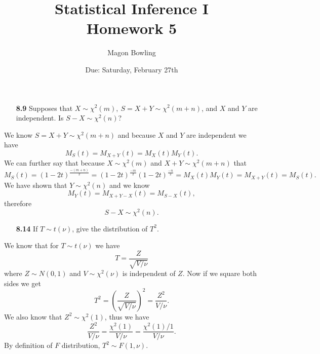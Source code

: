 \documentclass[11pt]{article}
\theoremstyle{definition}
\newcommand{\1}[1]{\mathbf{1} \left \{ #1 \right \}}
\begin{document}
\title{Statistical Inference I \\ Homework 5}
\date{Due: Saturday, February 27th}
\author{Magon Bowling}

\maketitle

\begin{itemize}
\item [{\color{red} \textbf{8.9}}] Supposes that $X \sim \chi^2(m), \ S = X+Y \sim \chi^2(m+n)$, and $X$ and $Y$ are independent. Is $S - X \sim \chi^2(n)$?
\end{itemize}
We know \(S = X+Y \sim \chi^2(m+n)\) and because $X$ and $Y$ are independent we have
\[M_S (t) = M_{X+Y} (t) = M_X (t) M_Y (t).\]
We can further say that because $X \sim \chi^2(m)$ and $X+Y \sim \chi^2(m+n)$ that
\[M_S (t) = (1-2t)^{\frac{-(m+n)}{2}} = (1-2t)^{\frac{-m}{2}} (1-2t)^{\frac{-n}{2}} = M_X (t) M_Y (t) = M_{X+Y} (t) = M_S (t).\]
We have shown that $Y \sim \chi^2(n)$ and we know
\[M_Y (t) = M_{X+Y-X} (t) = M_{S-X} (t),\]
therefore
\[S - X \sim \chi^2(n).\]

\begin{itemize}
\item [{\color{red} \textbf{8.14}}] If $T \sim t(\nu)$, give the distribution of $T^2$.
\end{itemize}
We know that for $T \sim t(\nu)$ we have
\[T = \frac{Z}{\sqrt{V/\nu}}\]
where $Z \sim N(0,1)$ and $V \sim \chi^2(\nu)$ is independent of $Z$.  Now if we square both sides we get
\[T^2 = \left(\frac{Z}{\sqrt{V/\nu}}\right)^2 = \frac{Z^2}{V/\nu}.\]
We also know that $Z^2 \sim \chi^2(1)$, thus we have
\[\frac{Z^2}{V/\nu} = \frac{\chi^2 (1)}{V/\nu} = \frac{\chi^2 (1)/1}{V/\nu}.\]
By definition of $F$ distribution, $T^2 \sim F(1,\nu)$.
\end{document}
